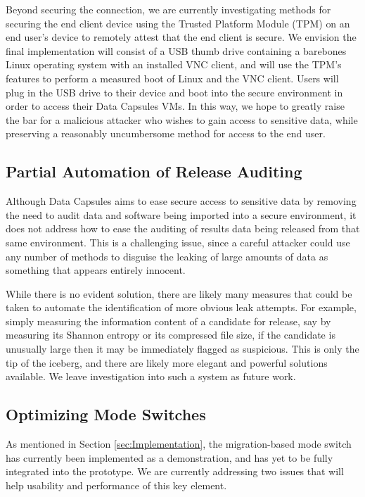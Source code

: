 \documentclass{acm_proc_article-sp}
\begin{document}
Beyond securing the connection, we are currently investigating methods for
securing the end client device using the Trusted Platform Module (TPM)
\cite{tpm} on an end user's device to remotely attest that the end client is
secure.  We envision the final implementation will consist of a USB thumb drive
containing a barebones Linux operating system with an installed VNC client, and
will use the TPM's features to perform a measured boot of Linux and the VNC
client.  Users will plug in the USB drive to their device and boot into the
secure environment in order to access their Data Capsules VMs.  In this way, we
hope to greatly raise the bar for a malicious attacker who wishes to gain
access to sensitive data, while preserving a reasonably uncumbersome method for
access to the end user.

\subsection{Partial Automation of Release Auditing}
\label{sec:Results Audit}

Although Data Capsules aims to ease secure access to sensitive data by removing
the need to audit data and software being imported into a secure environment, it
does not address how to ease the auditing of results data being released from
that same environment.  This is a challenging issue, since a careful attacker
could use any number of methods to disguise the leaking of large amounts of data
as something that appears entirely innocent.

While there is no evident solution, there are likely many measures that could be
taken to automate the identification of more obvious leak attempts.  For
example, simply measuring the information content of a candidate for release,
say by measuring its Shannon entropy or its compressed file size, if the
candidate is unusually large then it may be immediately flagged as suspicious.
This is only the tip of the iceberg, and there are likely more elegant and
powerful solutions available.  We leave investigation into such a system as
future work.

\subsection{Optimizing Mode Switches}

As mentioned in Section \ref{sec:Implementation}, the migration-based mode
switch has currently been implemented as a demonstration, and has yet to be
fully integrated into the prototype.  We are currently addressing two
issues that will help usability and performance of this key element.
\end{document}
